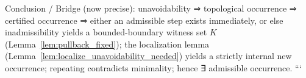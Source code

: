 Conclusion / Bridge (now precise): unavoidability ⇒ topological occurrence ⇒ certified occurrence ⇒ either an admissible step exists immediately, or else inadmissibility yields a bounded-boundary witness set $K$ (Lemma~\ref{lem:pullback_fixed}); the localization lemma (Lemma~\ref{lem:localize_unavoidability_needed}) yields a strictly internal new occurrence; repeating contradicts minimality; hence ∃ admissible occurrence.
```
